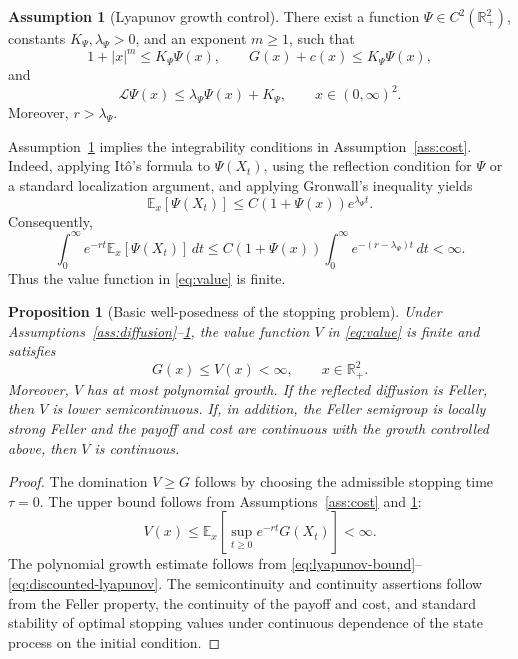 \documentclass[pdflatex,sn-mathphys-num]{sn-jnl}
\theoremstyle{plain}
\newtheorem{proposition}[theorem]{Proposition}
\theoremstyle{definition}
\newtheorem{assumption}[theorem]{Assumption}
\theoremstyle{remark}
\numberwithin{equation}{section}
\begin{document}
\begin{assumption}[Lyapunov growth control] \label{ass:lyapunov} 
There exist a function \(\Psi\in C^2(\mathbb R_+^2)\), constants \(K_\Psi,\lambda_\Psi>0\), and an exponent \(m\ge1\), such that 
\[ 1+|x|^m\le K_\Psi \Psi(x), \qquad G(x)+c(x)\le K_\Psi \Psi(x), \] 
and 
\[ \mathcal L\Psi(x)\le \lambda_\Psi \Psi(x)+K_\Psi, \qquad x\in(0,\infty)^2 . \] 
Moreover, \(r>\lambda_\Psi\). 
\end{assumption}

Assumption~\ref{ass:lyapunov} implies the integrability conditions in Assumption~\ref{ass:cost}. Indeed, applying It\^{o}'s formula to \(\Psi(X_t)\), using the reflection condition for \(\Psi\) or a standard localization argument, and applying Gronwall's inequality yields \begin{equation} \label{eq:lyapunov-bound} 
\mathbb E_x[\Psi(X_t)] \le C(1+\Psi(x))e^{\lambda_\Psi t}. 
\end{equation} 
Consequently, 
\begin{equation} \label{eq:discounted-lyapunov} 
\int_0^\infty e^{-rt}\mathbb E_x[\Psi(X_t)]\,dt \le C(1+\Psi(x)) \int_0^\infty e^{-(r-\lambda_\Psi)t}\,dt <\infty . 
\end{equation} 
Thus the value function in \eqref{eq:value} is finite. 

\begin{proposition}[Basic well-posedness of the stopping problem] \label{prop:basic-wellposedness} 
Under Assumptions~\ref{ass:diffusion}--\ref{ass:lyapunov}, the value function \(V\) in \eqref{eq:value} is finite and satisfies 
\[ G(x)\le V(x)<\infty, \qquad x\in\mathbb R_+^2 . \] 
Moreover, \(V\) has at most polynomial growth. If the reflected diffusion is Feller, then \(V\) is lower semicontinuous. If, in addition, the Feller semigroup is locally strong Feller and the payoff and cost are continuous with the growth controlled above, then \(V\) is continuous. 
\end{proposition} 
\begin{proof} 
The domination \(V\ge G\) follows by choosing the admissible stopping time \(\tau=0\). The upper bound follows from Assumptions~\ref{ass:cost} and \ref{ass:lyapunov}: 
\[ V(x) \le \mathbb E_x\left[\sup_{t\ge0}e^{-rt}G(X_t)\right] < \infty . \]
The polynomial growth estimate follows from \eqref{eq:lyapunov-bound}--\eqref{eq:discounted-lyapunov}. 
The semicontinuity and continuity assertions follow from the Feller property, the continuity of the payoff and cost, and standard stability of optimal stopping values under continuous dependence of the state process on the initial condition. 
\end{proof} 
\end{document}
